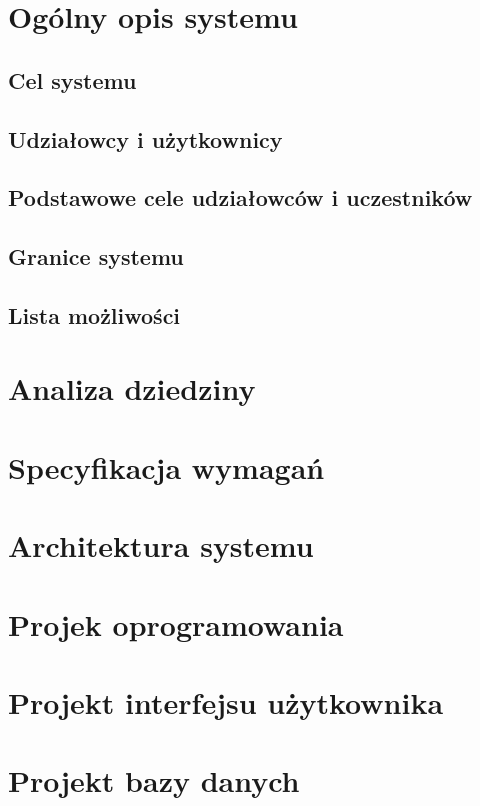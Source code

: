 \documentclass{sprawozdanie-agh}
\begin{document}

	\stronatytulowa{}

	\section{Ogólny opis systemu}

		\subsection{Cel systemu}

		\subsection{Udziałowcy i użytkownicy}

		\subsection{Podstawowe cele udziałowców i uczestników}

		\subsection{Granice systemu}

		\subsection{Lista możliwości}

	\section{Analiza dziedziny}

	\section{Specyfikacja wymagań}

	\section{Architektura systemu}

	\section{Projek oprogramowania}

	\section{Projekt interfejsu użytkownika}

	\section{Projekt bazy danych}
\end{document}

